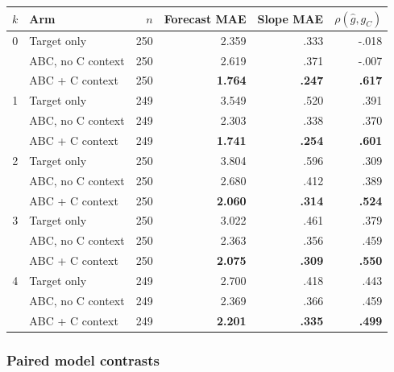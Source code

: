 \begin{center}
\begin{minipage}{\linewidth}
\centering
{}
\label{tab:coin-city-recovery-opus5}
\small
\begin{tabular}{c l r r r r}
\toprule
$k$ & Arm & $n$ & Forecast MAE & Slope MAE & $\rho(\hat g,g_C)$ \\
\midrule
0 & Target only & 250 & 2.359 & .333 & -.018 \\
  & ABC, no C context & 250 & 2.619 & .371 & -.007 \\
  & ABC + C context & 250 & \textbf{1.764} & \textbf{.247} & \textbf{.617} \\
\midrule
1 & Target only & 249 & 3.549 & .520 & .391 \\
  & ABC, no C context & 249 & 2.303 & .338 & .370 \\
  & ABC + C context & 249 & \textbf{1.741} & \textbf{.254} & \textbf{.601} \\
\midrule
2 & Target only & 250 & 3.804 & .596 & .309 \\
  & ABC, no C context & 250 & 2.680 & .412 & .389 \\
  & ABC + C context & 250 & \textbf{2.060} & \textbf{.314} & \textbf{.524} \\
\midrule
3 & Target only & 250 & 3.022 & .461 & .379 \\
  & ABC, no C context & 250 & 2.363 & .356 & .459 \\
  & ABC + C context & 250 & \textbf{2.075} & \textbf{.309} & \textbf{.550} \\
\midrule
4 & Target only & 249 & 2.700 & .418 & .443 \\
  & ABC, no C context & 249 & 2.369 & .366 & .459 \\
  & ABC + C context & 249 & \textbf{2.201} & \textbf{.335} & \textbf{.499} \\
\bottomrule
\end{tabular}
\end{minipage}
\end{center}



\subsubsection{Paired model contrasts}

